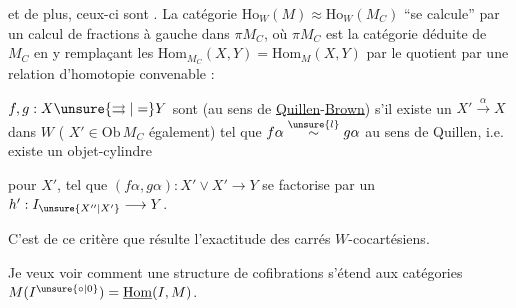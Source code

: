 
et de plus, ceux-ci sont \uline{}. La catégorie $\mathrm{Ho}_W(M)\approx\mathrm{Ho}_W(M_C)$ ``se calcule'' par un calcul de fractions à gauche dans $\pi M_C$, où $\pi M_C$ est la catégorie déduite de $M_C$ en y remplaçant les $\mathrm{Hom}_{M_C}(X,Y)=\mathrm{Hom}_M(X,Y)$ par le quotient par une relation d'homotopie convenable :

$f,g:X\unsure{\rightrightarrows|=}Y$ sont  (au sens de \uline{Quillen}-\uline{Brown}) s'il existe un $X'\xrightarrow{\alpha}X$ dans $W$ ( $X'\in\mathrm{Ob}\,M_C$ également) tel que $f\alpha\overset{\unsure{l}}{\sim}g\alpha$ au sens de Quillen, i.e. existe un objet-cylindre


pour $X'$, tel que $(f\alpha,g\alpha):X'\vee X'\longrightarrow Y$ se factorise par un $h':I_{\unsure{X''|X'}}\longrightarrow Y$.

C'est de ce critère que résulte l'exactitude  des carrés $W$-cocartésiens.

Je veux voir comment une structure de cofibrations s'étend aux catégories $M(I^{\unsure{\circ|0}})=\underline{\mathrm{Hom}}(I,M)$.  
